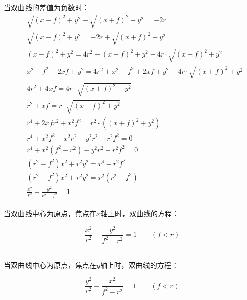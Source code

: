 \documentclass[UTF8]{ctexart}
\begin{document}
    当双曲线的差值为负数时：\vspace{8pt}
    \begin{align}
        &\sqrt{(x-f)^2+y^2}-\sqrt{(x+f)^2+y^2}=-2r\\[4mm]
        &\sqrt{(x-f)^2+y^2}=-2r+\sqrt{(x+f)^2+y^2}\\[4mm]
        &(x-f)^2+y^2=4r^2+(x+f)^2+y^2-4r \cdot \sqrt{(x+f)^2+y^2}\\[4mm]
        &x^2+f^2-2xf+y^2=4r^2+x^2+f^2+2xf+y^2-4r \cdot \sqrt{(x+f)^2+y^2}\\[4mm]
        &4r^2+4xf=4r \cdot \sqrt{(x+f)^2+y^2}\\[4mm]
        &r^2+xf=r \cdot \sqrt{(x+f)^2+y^2}\\[4mm]
        &r^4+2xfr^2+x^2f^2=r^2 \cdot ((x+f)^2+y^2)\\[4mm]
        &r^4+x^2f^2-x^2r^2-y^2r^2-r^2f^2=0\\[4mm]
        &r^4+x^2(f^2-r^2)-y^2r^2-r^2f^2=0\\[4mm]
        &(r^2-f^2)x^2+r^2y^2=r^4-r^2f^2\\[4mm]
        &(r^2-f^2)x^2+r^2y^2=r^2(r^2-f^2)\\[4mm]
        &\frac{x^2}{r^2}+\frac{y^2}{r^2-f^2}=1
    \end{align}\\[1mm]
    当双曲线中心为原点，焦点在$x$轴上时，双曲线的方程：\\
    \begin{large}
        \begin{equation*}
            \frac{x^2}{r^2}-\frac{y^2}{f^2-r^2}=1\qquad(f<r)
        \end{equation*}
    \end{large}\\[1mm]
    当双曲线中心为原点，焦点在$y$轴上时，双曲线的方程：\\
    \begin{large}
        \begin{equation*}
            \frac{y^2}{r^2}-\frac{x^2}{f^2-r^2}=1\qquad(f<r)
        \end{equation*}
    \end{large}

\newpage
\end{document}
